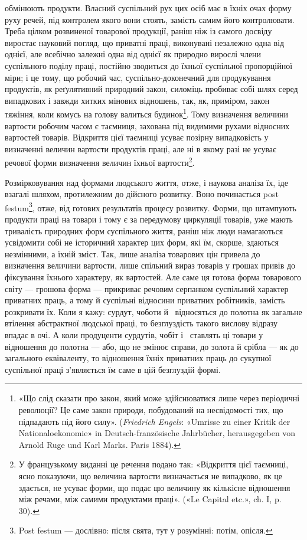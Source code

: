 \parcont{}  %
обмінюють продукти. Власний суспільний рух цих осіб має в
їхніх очах форму руху речей, під контролем якого вони стоять,
замість самим його контролювати. Треба цілком розвиненої товарової
продукції, раніш ніж із самого досвіду виростає науковий
погляд, що приватні праці, виконувані незалежно одна від однієї,
але всебічно залежні одна від однієї як природно вирослі члени
суспільного поділу праці, постійно зводиться до їхньої суспільної
пропорційної міри; і це тому, що робочий час, суспільно-доконечний
для продукування продуктів, як реґулятивний природний
закон, силоміць пробиває собі шлях серед випадкових і завжди
хитких мінових відношень, так, як, приміром, закон тяжіння,
коли комусь на голову валиться будинок\footnote{
«Що слід сказати про закон, який може здійснюватися лише
через періодичні революції? Це саме закон природи, побудований на
несвідомості тих, що підпадають під його силу». (\emph{Friedrich Engels}: «Umrisse
zu einer Kritik der Nationaloekonomie» in Deutsch-französische
Jahrbücher, herausgegeben von Arnold Ruge und Karl Marks. Paris 1884).
}. Тому визначення
величини вартости робочим часом є таємниця, захована під видимими
рухами відносних вартостей товарів. Відкриття цієї таємниці
усуває позірну випадковість у визначенні величин вартости
продуктів праці, але ні в якому разі не усуває речової форми визначення
величин їхньої вартости\footnote*{
У французькому виданні це речення подано так: «Відкриття цієї
таємниці, ясно показуючи, що величина вартости визначається не випадково,
як це здається, не усуває форми, що подає цю величину як кількісне
відношення між речами, між самими продуктами праці». («Le Capital
etc.», ch. I, p. 30).
}.

Розмірковування над формами людського життя, отже, і наукова
аналіза їх, іде взагалі шляхом, протилежним до дійсного
розвитку. Воно починається post festum\footnote*{
Post festum — дослівно: після свята, тут у розумінні: потім,
опісля. 
}, отже, від готових результатів
процесу розвитку. Форми, що штампують продукти
праці на товари і тому є за передумову циркуляції товарів, уже
мають тривалість природних форм суспільного життя, раніш ніж
люди намагаються усвідомити собі не історичний характер цих
форм, які їм, скорше, здаються незмінними, а їхній зміст. Так,
лише аналіза товарових цін привела до визначення величини вартости,
лише спільний вираз товарів у грошах привів до фіксування
їхнього характеру, як вартостей. Але саме ця готова форма
товарового світу — грошова форма — прикриває речовим серпанком
суспільний характер приватних праць, а тому й суспільні
відносини приватних робітників, замість розкривати їх. Коли я
кажу: сурдут, чоботи й~ відносяться до полотна як загальне
втілення абстрактної людської праці, то безглуздість такого
вислову відразу впадає в очі. А коли продуценти сурдутів, чобіт
і~ ставлять ці товари у відношення до полотна — або, що не
змінює справи, до золота й срібла — як до загального еквіваленту,
то відношення їхніх приватних праць до сукупної суспільної
праці з’являється їм саме в цій безглуздій формі.
